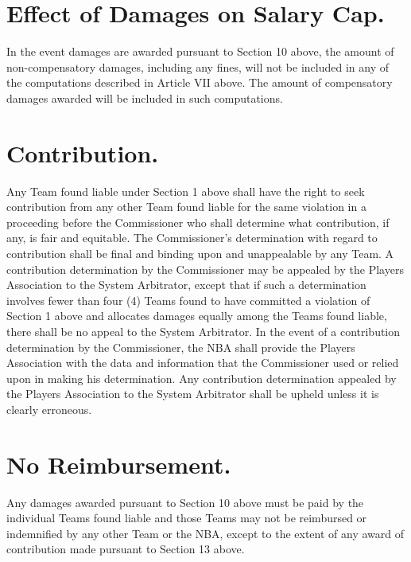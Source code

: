 \documentclass[
]{book}
\begin{document}
\hypertarget{effect-of-damages-on-salary-cap.}{%
\section{Effect of Damages on Salary Cap.}\label{effect-of-damages-on-salary-cap.}}

In the event damages are awarded pursuant to Section 10 above, the amount of non-compensatory damages, including any fines, will not be included in any of the computations described in Article VII above. The amount of compensatory damages awarded will be included in such computations.

\hypertarget{contribution.}{%
\section{Contribution.}\label{contribution.}}

Any Team found liable under Section 1 above shall have the right to seek contribution from any other Team found liable for the same violation in a proceeding before the Commissioner who shall determine what contribution, if any, is fair and equitable. The Commissioner's determination with regard to contribution shall be final and binding upon and unappealable by any Team. A contribution determination by the Commissioner may be appealed by the Players Association to the System Arbitrator, except that if such a determination involves fewer than four (4) Teams found to have committed a violation of Section 1 above and allocates damages equally among the Teams found liable, there shall be no appeal to the System Arbitrator. In the event of a contribution determination by the Commissioner, the NBA shall provide the Players Association with the data and information that the Commissioner used or relied upon in making his determination. Any contribution determination appealed by the Players Association to the System Arbitrator shall be upheld unless it is clearly erroneous.

\hypertarget{no-reimbursement.}{%
\section{No Reimbursement.}\label{no-reimbursement.}}

Any damages awarded pursuant to Section 10 above must be paid by the individual Teams found liable and those Teams may not be reimbursed or indemnified by any other Team or the NBA, except to the extent of any award of contribution made pursuant to Section 13 above.
\end{document}

